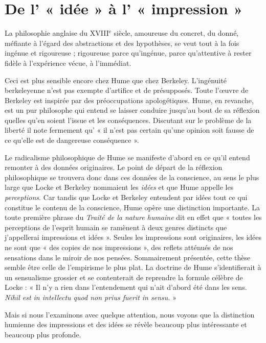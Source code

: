 
\section{De l’ « idée » à l’ « impression »}
%
La philosophie anglaise du {\footnotesize XVIII}$^\text{e}$ siècle, amoureuse du concret, du donné, méfiante à l’égard des abstractions et
des hypothèses, se veut tout à la fois ingénue et rigoureuse ; rigoureuse parce qu’ingénue, parce qu’attentive à
rester fidèle à l'expérience vécue, à l’immédiat.

Ceci est plus sensible encore chez Hume que chez
Berkeley. L’ingénuité berkeleyenne n’est pas exempte
d'artifice et de présupposés. Toute l’œuvre de Berkeley
est inspirée par des préoccupations apologétiques. Hume,
en revanche, est un pur philosophe qui entend se laisser
conduire jusqu’au bout de sa réflexion quelles qu’en
soient l’issue et les conséquences. Discutant sur le problème
de la liberté il note fermement qu’ « il n’est pas certain
qu’une opinion soit fausse de ce qu’elle est de dangereuse
conséquence ».

Le radicalisme philosophique de Hume se manifeste
d’abord en ce qu’il entend remonter à des données originaires. Le point de départ de la réflexion philosophique
se trouvera donc dans ces données de la conscience, au
sens le plus large que Locke et Berkeley nommaient les
{\it idées} et que Hume appelle les {\it perceptions}. Car tandis que
Locke et Berkeley entendent par idées tout ce qui constitue
le contenu de la conscience, Hume opère une distinction
importante. La toute première phrase du {\it Traité de la nature
humaine} dit en effet que « toutes les perceptions de
l'esprit humain se ramènent à deux genres distincts que
j’appellerai impressions et idées ». Seules les impressions
sont originaires, les idées ne sont que « des copies de nos
impressions », des reflets atténués de nos sensations dans
le miroir de nos pensées. Sommairement présentée, cette
thèse semble être celle de l’empirisme le plus plat. La
doctrine de Hume s’identifierait à un sensualisme grossier
et se contenterait de reprendre la formule célèbre de
Locke : « Il n’y a rien dans l’entendement qui n’ait d’abord
été dans les sens. {\it Nihil est in intellectu quod non prius fuerit in sensu.} »

Mais si nous l’examinons avec quelque attention, nous
voyons que la distinction humienne des impressions et
des idées se révèle beaucoup plus intéressante et beaucoup
plus profonde.

